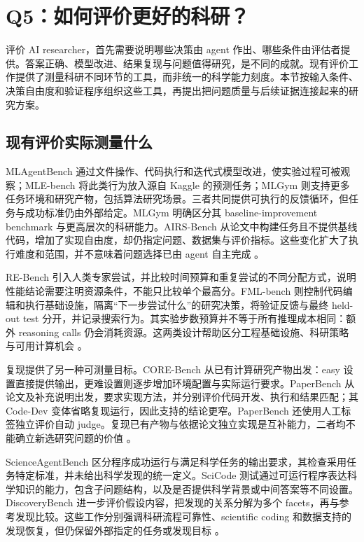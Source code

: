 \section{Q5：如何评价更好的科研？}
\label{sec:evaluation}

评价 AI researcher，首先需要说明哪些决策由 agent 作出、哪些条件由评估者提供。答案正确、模型改进、结果复现与问题值得研究，是不同的成就。现有评价工作提供了测量科研不同环节的工具，而非统一的科学能力刻度。本节按输入条件、决策自由度和验证程序组织这些工具，再提出把问题质量与后续证据连接起来的研究方案。

\subsection{现有评价实际测量什么}

MLAgentBench 通过文件操作、代码执行和迭代式模型改进，使实验过程可被观察；MLE-bench 将此类行为放入源自 Kaggle 的预测任务；MLGym 则支持更多任务环境和研究产物，包括算法研究场景。三者共同提供可执行的反馈循环，但任务与成功标准仍由外部给定。MLGym 明确区分其 baseline-improvement benchmark 与更高层次的科研能力。AIRS-Bench 从论文中构建任务且不提供基线代码，增加了实现自由度，却仍指定问题、数据集与评价指标。这些变化扩大了执行难度和范围，并不意味着问题选择已由 agent 自主完成 \cite{mlagentbench,mle-bench,mlgym,airs-bench}。

RE-Bench 引入人类专家尝试，并比较时间预算和重复尝试的不同分配方式，说明性能结论需要注明资源条件，不能只比较单个最高分。FML-bench 则控制代码编辑和执行基础设施，隔离“下一步尝试什么”的研究决策，将验证反馈与最终 held-out test 分开，并记录搜索行为。其实验步数预算并不等于所有推理成本相同：额外 reasoning calls 仍会消耗资源。这两类设计帮助区分工程基础设施、科研策略与可用计算机会 \cite{re-bench,fml-bench}。

复现提供了另一种可测量目标。CORE-Bench 从已有计算研究产物出发：easy 设置直接提供输出，更难设置则逐步增加环境配置与实际运行要求。PaperBench 从论文及补充说明出发，要求实现方法，并分别评价代码开发、执行和结果匹配；其 Code-Dev 变体省略复现运行，因此支持的结论更窄。PaperBench 还使用人工标签独立评价自动 judge。复现已有产物与依据论文独立实现是互补能力，二者均不能确立新选研究问题的价值 \cite{core-bench,paperbench}。

ScienceAgentBench 区分程序成功运行与满足科学任务的输出要求，其检查采用任务特定标准，并未给出科学发现的统一定义。SciCode 测试通过可运行程序表达科学知识的能力，包含子问题结构，以及是否提供科学背景或中间答案等不同设置。DiscoveryBench 进一步评价假设内容，把发现的关系分解为多个 facets，再与参考发现比较。这些工作分别强调科研流程可靠性、scientific coding 和数据支持的发现恢复，但仍保留外部指定的任务或发现目标 \cite{scienceagentbench,scicode,discoverybench}。

